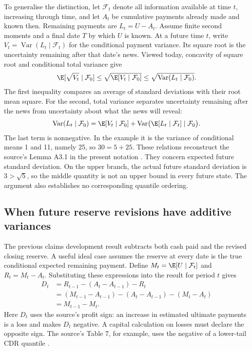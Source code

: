 To generalise the distinction, let $\mathcal F_t$ denote all information
available at time $t$, increasing through time, and let $A_t$ be cumulative
payments already made and known then. Remaining payments are $L_t=U-A_t$.
Assume finite second moments and a final date $T$ by which $U$ is known.
At a future time $t$, write
$V_t=\operatorname{Var}(L_t\mid\mathcal F_t)$ for the conditional payment
variance. Its square root is the uncertainty remaining after that date's
news. Viewed today, concavity of square root and conditional total variance
give
\[
 \E[\sqrt{V_t}\mid\mathcal F_0]
 \leq\sqrt{\E[V_t\mid\mathcal F_0]}
 \leq\sqrt{\operatorname{Var}(L_t\mid\mathcal F_0)}.
\]
The first inequality compares an average of standard deviations with their
root mean square. For the second, total variance separates uncertainty
remaining after the news from uncertainty about what the news will reveal:
\[
 \operatorname{Var}(L_t\mid\mathcal F_0)
 =\E[V_t\mid\mathcal F_0]
  +\operatorname{Var}\bigl(\E[L_t\mid\mathcal F_t]\mid\mathcal F_0\bigr).
\]
The last term is nonnegative. In the example it is the variance of conditional
means 1 and 11, namely 25, so $30=5+25$. These relations reconstruct the
source's Lemma A3.1 in the present notation
\citep[Appendix 3]{england2019lifetime}. They concern expected future standard
deviation. On the upper branch, the actual future standard deviation is
$3>\sqrt5$, so the middle quantity is not an upper bound in every future
state. The argument also establishes no corresponding quantile ordering.

\subsection{When future reserve revisions have additive variances}

The previous claims development result subtracts both cash paid and the
revised closing reserve. A useful ideal case assumes the reserve at every
date is the true conditional expected remaining payment. Define
$M_t=\E[U\mid\mathcal F_t]$ and $R_t=M_t-A_t$. Substituting these expressions
into the result for period $t$ gives
\[
 \begin{aligned}
 D_t
 &=R_{t-1}-(A_t-A_{t-1})-R_t\\
 &=(M_{t-1}-A_{t-1})-(A_t-A_{t-1})-(M_t-A_t)\\
 &=M_{t-1}-M_t.
 \end{aligned}
\]
Here $D_t$ uses the source's profit sign: an increase in estimated ultimate
payments is a loss and makes $D_t$ negative. A capital calculation on losses
must declare the opposite sign. The source's Table 7, for example, uses the
negative of a lower-tail CDR quantile
\citep[equations 5--9 and Section 4]{england2019lifetime}.


